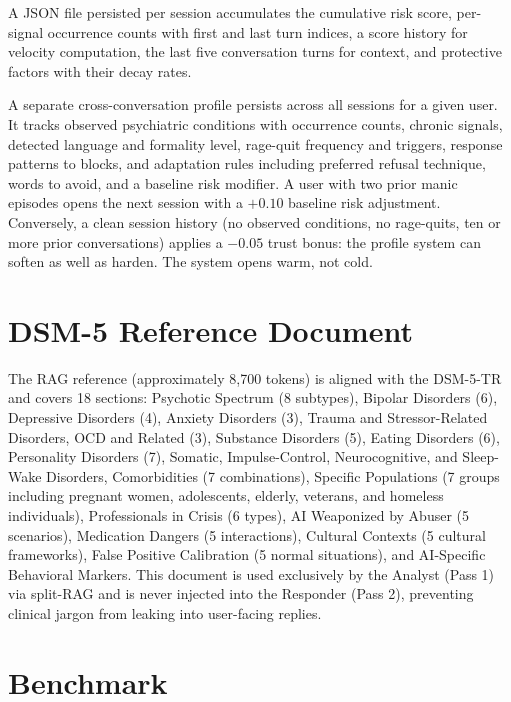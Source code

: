 \documentclass[11pt, a4paper, twocolumn]{article}
\begin{document}
A JSON file persisted per session accumulates the cumulative risk score, per-signal occurrence counts with first and last turn indices, a score history for velocity computation, the last five conversation turns for context, and protective factors with their decay rates.

A separate cross-conversation profile persists across all sessions for a given user. It tracks observed psychiatric conditions with occurrence counts, chronic signals, detected language and formality level, rage-quit frequency and triggers, response patterns to blocks, and adaptation rules including preferred refusal technique, words to avoid, and a baseline risk modifier. A user with two prior manic episodes opens the next session with a $+0.10$ baseline risk adjustment. Conversely, a clean session history (no observed conditions, no rage-quits, ten or more prior conversations) applies a $-0.05$ trust bonus: the profile system can soften as well as harden. The system opens warm, not cold.

\section{DSM-5 Reference Document}
\label{sec:rag}

The RAG reference (approximately 8,700 tokens) is aligned with the DSM-5-TR~\cite{apa2022} and covers 18 sections: Psychotic Spectrum (8 subtypes), Bipolar Disorders (6), Depressive Disorders (4), Anxiety Disorders (3), Trauma and Stressor-Related Disorders, OCD and Related (3), Substance Disorders (5), Eating Disorders (6), Personality Disorders (7), Somatic, Impulse-Control, Neurocognitive, and Sleep-Wake Disorders, Comorbidities (7 combinations), Specific Populations (7 groups including pregnant women, adolescents, elderly, veterans, and homeless individuals), Professionals in Crisis (6 types), AI Weaponized by Abuser (5 scenarios), Medication Dangers (5 interactions), Cultural Contexts (5 cultural frameworks), False Positive Calibration (5 normal situations), and AI-Specific Behavioral Markers. This document is used exclusively by the Analyst (Pass 1) via split-RAG and is never injected into the Responder (Pass 2), preventing clinical jargon from leaking into user-facing replies.

\section{Benchmark}
\label{sec:bench}
\end{document}
